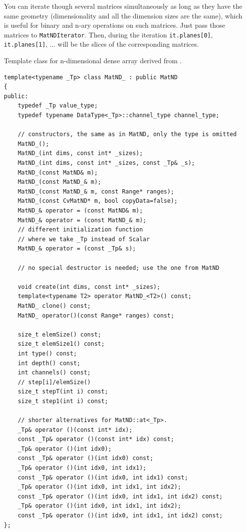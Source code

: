 You can iterate though several matrices simultaneously as long as they have the same geometry (dimensionality and all the dimension sizes are the same), which is useful for binary and n-ary operations on such matrices. Just pass those matrices to \texttt{MatNDIterator}. Then, during the iteration \texttt{it.planes[0]}, \texttt{it.planes[1]}, ... will be the slices of the corresponding matrices.

Template class for n-dimensional dense array derived from .

\begin{lstlisting}
template<typename _Tp> class MatND_ : public MatND
{
public:
    typedef _Tp value_type;
    typedef typename DataType<_Tp>::channel_type channel_type;

    // constructors, the same as in MatND, only the type is omitted
    MatND_();
    MatND_(int dims, const int* _sizes);
    MatND_(int dims, const int* _sizes, const _Tp& _s);
    MatND_(const MatND& m);
    MatND_(const MatND_& m);
    MatND_(const MatND_& m, const Range* ranges);
    MatND_(const CvMatND* m, bool copyData=false);
    MatND_& operator = (const MatND& m);
    MatND_& operator = (const MatND_& m);
    // different initialization function
    // where we take _Tp instead of Scalar
    MatND_& operator = (const _Tp& s);

    // no special destructor is needed; use the one from MatND

    void create(int dims, const int* _sizes);
    template<typename T2> operator MatND_<T2>() const;
    MatND_ clone() const;
    MatND_ operator()(const Range* ranges) const;

    size_t elemSize() const;
    size_t elemSize1() const;
    int type() const;
    int depth() const;
    int channels() const;
    // step[i]/elemSize()
    size_t stepT(int i) const;
    size_t step1(int i) const;

    // shorter alternatives for MatND::at<_Tp>.
    _Tp& operator ()(const int* idx);
    const _Tp& operator ()(const int* idx) const;
    _Tp& operator ()(int idx0);
    const _Tp& operator ()(int idx0) const;
    _Tp& operator ()(int idx0, int idx1);
    const _Tp& operator ()(int idx0, int idx1) const;
    _Tp& operator ()(int idx0, int idx1, int idx2);
    const _Tp& operator ()(int idx0, int idx1, int idx2) const;
    _Tp& operator ()(int idx0, int idx1, int idx2);
    const _Tp& operator ()(int idx0, int idx1, int idx2) const;
};
\end{lstlisting}

